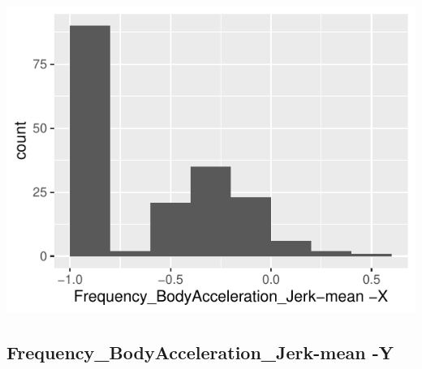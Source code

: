\documentclass[
]{article}
\begin{document}
\begin{minipage}{0.25 \textwidth}

\includegraphics{codebook_tidydatasub_files/figure-latex/Var-52-Frequency-BodyAcceleration-Jerk-mean--X-1.pdf}

\end{minipage}

\noindent\makebox[\linewidth]{\rule{\textwidth}{0.4pt}}

\hypertarget{frequency_bodyacceleration_jerk-mean--y}{%
\subsection{Frequency\_BodyAcceleration\_Jerk-mean
-Y}\label{frequency_bodyacceleration_jerk-mean--y}}
\end{document}
